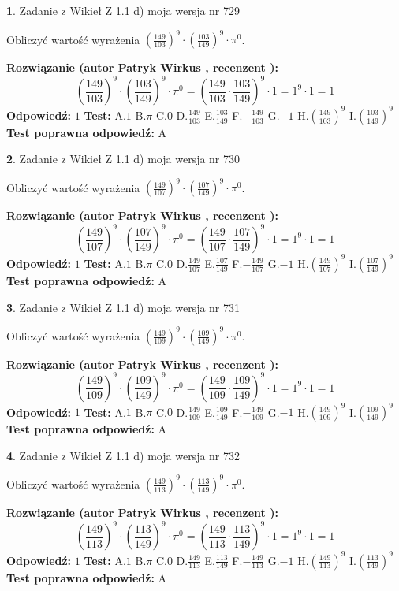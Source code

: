 \documentclass[12pt, a4paper]{article}
\theoremstyle{definition} %
\newtheorem{zad}{}
\newcommand{\zadStart}[1]{\begin{zad}#1\newline}
\newcommand{\zadStop}{\end{zad}}
\newcommand{\rozwStart}[2]{\noindent \textbf{Rozwiązanie (autor #1 , recenzent #2): }\newline}
\newcommand{\rozwStop}{\newline}
\newcommand{\odpStart}{\noindent \textbf{Odpowiedź:}\newline}
\newcommand{\odpStop}{\newline}
\newcommand{\testStart}{\noindent \textbf{Test:}\newline}
\newcommand{\testStop}{\newline}
\newcommand{\kluczStart}{\noindent \textbf{Test poprawna odpowiedź:}\newline}
\newcommand{\kluczStop}{\newline}
\begin{document}
\zadStart{Zadanie z Wikieł Z 1.1 d) moja wersja nr 729}

Obliczyć wartość wyrażenia $(\frac{149}{103})^{9} \cdot (\frac{103}{149})^{9} \cdot \pi^{0}$.
\zadStop
\rozwStart{Patryk Wirkus}{}
$$(\frac{149}{103})^{9} \cdot (\frac{103}{149})^{9} \cdot \pi^{0} = (\frac{149}{103} \cdot \frac{103}{149})^{9} \cdot 1 = 1^{9} \cdot 1 = 1$$
\rozwStop
\odpStart
$1$
\odpStop
\testStart
A.$1$ B.$\pi$ C.$0$ D.$\frac{149}{103}$ E.$\frac{103}{149}$
F.$-\frac{149}{103}$ G.$-1$
H.$(\frac{149}{103})^{9}$
I.$(\frac{103}{149})^{9}$
\testStop
\kluczStart
A
\kluczStop



\zadStart{Zadanie z Wikieł Z 1.1 d) moja wersja nr 730}

Obliczyć wartość wyrażenia $(\frac{149}{107})^{9} \cdot (\frac{107}{149})^{9} \cdot \pi^{0}$.
\zadStop
\rozwStart{Patryk Wirkus}{}
$$(\frac{149}{107})^{9} \cdot (\frac{107}{149})^{9} \cdot \pi^{0} = (\frac{149}{107} \cdot \frac{107}{149})^{9} \cdot 1 = 1^{9} \cdot 1 = 1$$
\rozwStop
\odpStart
$1$
\odpStop
\testStart
A.$1$ B.$\pi$ C.$0$ D.$\frac{149}{107}$ E.$\frac{107}{149}$
F.$-\frac{149}{107}$ G.$-1$
H.$(\frac{149}{107})^{9}$
I.$(\frac{107}{149})^{9}$
\testStop
\kluczStart
A
\kluczStop



\zadStart{Zadanie z Wikieł Z 1.1 d) moja wersja nr 731}

Obliczyć wartość wyrażenia $(\frac{149}{109})^{9} \cdot (\frac{109}{149})^{9} \cdot \pi^{0}$.
\zadStop
\rozwStart{Patryk Wirkus}{}
$$(\frac{149}{109})^{9} \cdot (\frac{109}{149})^{9} \cdot \pi^{0} = (\frac{149}{109} \cdot \frac{109}{149})^{9} \cdot 1 = 1^{9} \cdot 1 = 1$$
\rozwStop
\odpStart
$1$
\odpStop
\testStart
A.$1$ B.$\pi$ C.$0$ D.$\frac{149}{109}$ E.$\frac{109}{149}$
F.$-\frac{149}{109}$ G.$-1$
H.$(\frac{149}{109})^{9}$
I.$(\frac{109}{149})^{9}$
\testStop
\kluczStart
A
\kluczStop



\zadStart{Zadanie z Wikieł Z 1.1 d) moja wersja nr 732}

Obliczyć wartość wyrażenia $(\frac{149}{113})^{9} \cdot (\frac{113}{149})^{9} \cdot \pi^{0}$.
\zadStop
\rozwStart{Patryk Wirkus}{}
$$(\frac{149}{113})^{9} \cdot (\frac{113}{149})^{9} \cdot \pi^{0} = (\frac{149}{113} \cdot \frac{113}{149})^{9} \cdot 1 = 1^{9} \cdot 1 = 1$$
\rozwStop
\odpStart
$1$
\odpStop
\testStart
A.$1$ B.$\pi$ C.$0$ D.$\frac{149}{113}$ E.$\frac{113}{149}$
F.$-\frac{149}{113}$ G.$-1$
H.$(\frac{149}{113})^{9}$
I.$(\frac{113}{149})^{9}$
\testStop
\kluczStart
A
\kluczStop
\end{document}
